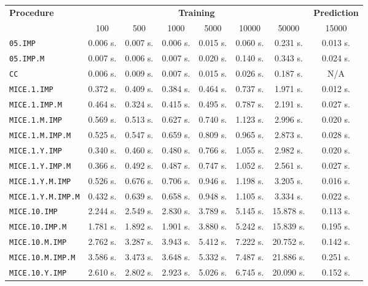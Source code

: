 \begin{table}[htbp]
\centering
\begin{tabular}{|l|c|c|c|c|c|c|c|}
\toprule
\textbf{Procedure} & \multicolumn{6}{c|}{\textbf{Training}} & \multicolumn{1}{c|}{\textbf{Prediction}} \\
\cmidrule(lr){2-7} \cmidrule(lr){8-8}
& 100 & 500 & 1000 & 5000 & 10000 & 50000 & 15000 \\
\midrule
\texttt{05.IMP} & 0.006 s. & 0.007 s. & 0.006 s. & 0.015 s. & 0.060 s. & 0.231 s. & 0.013 s. \\
\texttt{05.IMP.M} & 0.007 s. & 0.006 s. & 0.007 s. & 0.020 s. & 0.140 s. & 0.343 s. & 0.024 s. \\
\texttt{CC} & 0.006 s. & 0.009 s. & 0.007 s. & 0.015 s. & 0.026 s. & 0.187 s. & N/A \\
\texttt{MICE.1.IMP} & 0.372 s. & 0.409 s. & 0.384 s. & 0.464 s. & 0.737 s. & 1.971 s. & 0.012 s. \\
\texttt{MICE.1.IMP.M} & 0.464 s. & 0.324 s. & 0.415 s. & 0.495 s. & 0.787 s. & 2.191 s. & 0.027 s. \\
\texttt{MICE.1.M.IMP} & 0.569 s. & 0.513 s. & 0.627 s. & 0.740 s. & 1.123 s. & 2.996 s. & 0.020 s. \\
\texttt{MICE.1.M.IMP.M} & 0.525 s. & 0.547 s. & 0.659 s. & 0.809 s. & 0.965 s. & 2.873 s. & 0.028 s. \\
\texttt{MICE.1.Y.IMP} & 0.340 s. & 0.460 s. & 0.480 s. & 0.766 s. & 1.055 s. & 2.982 s. & 0.020 s. \\
\texttt{MICE.1.Y.IMP.M} & 0.366 s. & 0.492 s. & 0.487 s. & 0.747 s. & 1.052 s. & 2.561 s. & 0.027 s. \\
\texttt{MICE.1.Y.M.IMP} & 0.526 s. & 0.676 s. & 0.706 s. & 0.946 s. & 1.198 s. & 3.205 s. & 0.016 s. \\
\texttt{MICE.1.Y.M.IMP.M} & 0.432 s. & 0.639 s. & 0.658 s. & 0.948 s. & 1.105 s. & 3.334 s. & 0.022 s. \\
\texttt{MICE.10.IMP} & 2.244 s. & 2.549 s. & 2.830 s. & 3.789 s. & 5.145 s. & 15.878 s. & 0.113 s. \\
\texttt{MICE.10.IMP.M} & 1.781 s. & 1.892 s. & 1.901 s. & 3.880 s. & 5.242 s. & 15.839 s. & 0.195 s. \\
\texttt{MICE.10.M.IMP} & 2.762 s. & 3.287 s. & 3.943 s. & 5.412 s. & 7.222 s. & 20.752 s. & 0.142 s. \\
\texttt{MICE.10.M.IMP.M} & 3.586 s. & 3.473 s. & 3.648 s. & 5.332 s. & 7.487 s. & 21.886 s. & 0.251 s. \\
\texttt{MICE.10.Y.IMP} & 2.610 s. & 2.802 s. & 2.923 s. & 5.026 s. & 6.745 s. & 20.090 s. & 0.152 s. \\

\end{tabular}
\end{table}
